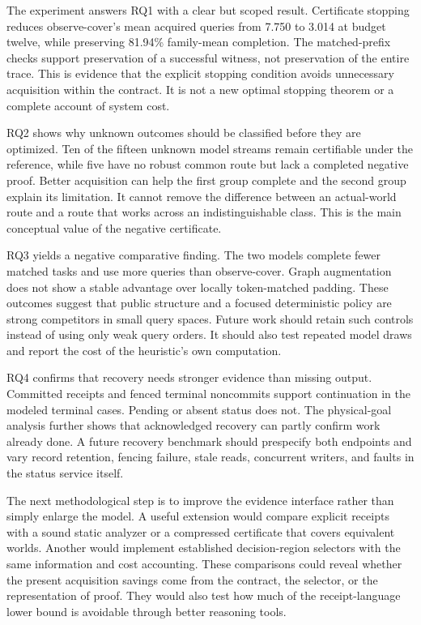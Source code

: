\documentclass[conference]{IEEEtran}
\begin{document}
The experiment answers RQ1 with a clear but scoped result. Certificate stopping reduces observe-cover's mean acquired queries from 7.750 to 3.014 at budget twelve, while preserving 81.94\% family-mean completion. The matched-prefix checks support preservation of a successful witness, not preservation of the entire trace. This is evidence that the explicit stopping condition avoids unnecessary acquisition within the contract. It is not a new optimal stopping theorem or a complete account of system cost.

RQ2 shows why unknown outcomes should be classified before they are optimized. Ten of the fifteen unknown model streams remain certifiable under the reference, while five have no robust common route but lack a completed negative proof. Better acquisition can help the first group complete and the second group explain its limitation. It cannot remove the difference between an actual-world route and a route that works across an indistinguishable class. This is the main conceptual value of the negative certificate.

RQ3 yields a negative comparative finding. The two models complete fewer matched tasks and use more queries than observe-cover. Graph augmentation does not show a stable advantage over locally token-matched padding. These outcomes suggest that public structure and a focused deterministic policy are strong competitors in small query spaces. Future work should retain such controls instead of using only weak query orders. It should also test repeated model draws and report the cost of the heuristic's own computation.

RQ4 confirms that recovery needs stronger evidence than missing output. Committed receipts and fenced terminal noncommits support continuation in the modeled terminal cases. Pending or absent status does not. The physical-goal analysis further shows that acknowledged recovery can partly confirm work already done. A future recovery benchmark should prespecify both endpoints and vary record retention, fencing failure, stale reads, concurrent writers, and faults in the status service itself.

The next methodological step is to improve the evidence interface rather than simply enlarge the model. A useful extension would compare explicit receipts with a sound static analyzer or a compressed certificate that covers equivalent worlds. Another would implement established decision-region selectors with the same information and cost accounting. These comparisons could reveal whether the present acquisition savings come from the contract, the selector, or the representation of proof. They would also test how much of the receipt-language lower bound is avoidable through better reasoning tools.
\end{document}
